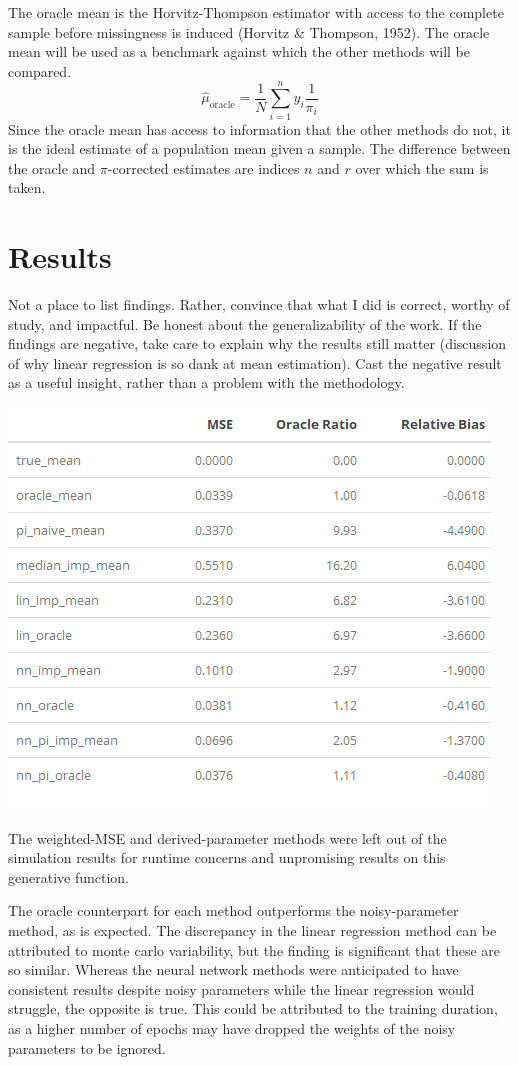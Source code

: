 \documentclass[12pt,twoside]{reedthesis}
\begin{document}
The oracle mean is the Horvitz-Thompson estimator with access to the
complete sample before missingness is induced (Horvitz \& Thompson,
1952). The oracle mean will be used as a benchmark against which the
other methods will be compared. \[
\hat \mu_{\text{oracle}} = \frac{1}{N} \sum_{i=1}^n y_i \frac{1}{\pi_i}
\] Since the oracle mean has access to information that the other
methods do not, it is the ideal estimate of a population mean given a
sample. The difference between the oracle and \(\pi\)-corrected
estimates are indices \(n\) and \(r\) over which the sum is taken.

\section{Results}\label{sim_results}

Not a place to list findings. Rather, convince that what I did is
correct, worthy of study, and impactful. Be honest about the
generalizability of the work. If the findings are negative, take care to
explain why the results still matter (discussion of why linear
regression is so dank at mean estimation). Cast the negative result as a
useful insight, rather than a problem with the methodology.

\includegraphics{figure/AWS_results.png}

The weighted-MSE and derived-parameter methods were left out of the
simulation results for runtime concerns and unpromising results on this
generative function.

The oracle counterpart for each method outperforms the noisy-parameter
method, as is expected. The discrepancy in the linear regression method
can be attributed to monte carlo variability, but the finding is
significant that these are so similar. Whereas the neural network
methods were anticipated to have consistent results despite noisy
parameters while the linear regression would struggle, the opposite is
true. This could be attributed to the training duration, as a higher
number of epochs may have dropped the weights of the noisy parameters to
be ignored.
\end{document}
